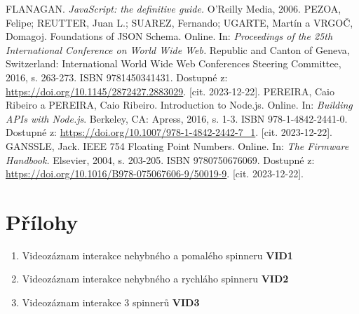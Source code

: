 \documentclass[12pt, a4paper,
 twoside,        %
 openright
]{report}
\begin{document}
\begin{thebibliography}{99}
     FLANAGAN. \textit{JavaScript: the definitive guide.} O'Reilly Media, 2006.
     PEZOA, Felipe; REUTTER, Juan L.; SUAREZ, Fernando; UGARTE, Martín a VRGOČ, Domagoj. Foundations of JSON Schema. Online. In: \textit{Proceedings of the 25th International Conference on World Wide Web.} Republic and Canton of Geneva, Switzerland: International World Wide Web Conferences Steering Committee, 2016, s. 263-273. ISBN 9781450341431. Dostupné z: \url{https://doi.org/10.1145/2872427.2883029}. [cit. 2023-12-22].
     PEREIRA, Caio Ribeiro a PEREIRA, Caio Ribeiro. Introduction to Node.js. Online. In: \textit{Building APIs with Node.js}. Berkeley, CA: Apress, 2016, s. 1-3. ISBN 978-1-4842-2441-0. Dostupné z: \url{https://doi.org/10.1007/978-1-4842-2442-7_1}. [cit. 2023-12-22].
    GANSSLE, Jack. IEEE 754 Floating Point Numbers. Online. In: \textit{The Firmware Handbook.} Elsevier, 2004, s. 203-205. ISBN 9780750676069. Dostupné z: \url{https://doi.org/10.1016/B978-075067606-9/50019-9}. [cit. 2023-12-22].
\end{thebibliography}

\listoffigures

\listoftables

\lstlistoflistings

\chapter*{Přílohy}
\begin{enumerate}[topsep=0pt, partopsep=0pt]
    \setlength{\itemsep}{0pt}%
    \setlength{\parskip}{0pt}%
    \item \label{attachment_1} Videozáznam interakce nehybného a pomalého spinneru \dotfill \textbf{VID1}
    \item \label{attachment_2} Videozáznam interakce nehybného a rychláho spinneru \dotfill \textbf{VID2}
    \item \label{attachment_3} Videozáznam interakce 3 spinnerů \dotfill \textbf{VID3}
\end{enumerate}
\end{document}
